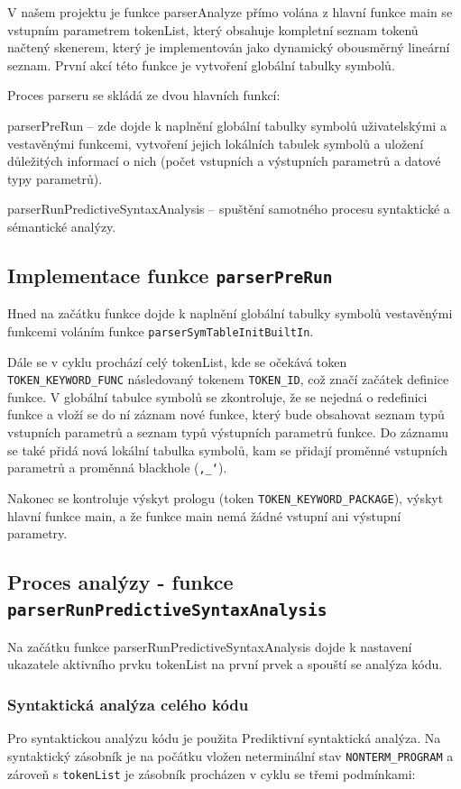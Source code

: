 \documentclass[a4paper, 12pt]{article}
\begin{document}
V našem projektu je funkce parserAnalyze přímo volána z hlavní funkce main se vstupním parametrem tokenList, který obsahuje kompletní seznam tokenů načtený skenerem, který je implementován jako dynamický obousměrný lineární seznam. První akcí této funkce je vytvoření globální tabulky symbolů.

Proces parseru se skládá ze dvou hlavních funkcí:

parserPreRun – zde dojde k naplnění globální tabulky symbolů uživatelskými a vestavěnými funkcemi, vytvoření jejich lokálních tabulek symbolů a uložení důležitých informací o nich (počet vstupních a výstupních parametrů a datové typy parametrů).

parserRunPredictiveSyntaxAnalysis – spuštění samotného procesu syntaktické a sémantické analýzy.

\subsection{Implementace funkce \protect\Verb|parserPreRun|}
Hned na začátku funkce dojde k naplnění globální tabulky symbolů vestavěnými funkcemi voláním funkce \verb|parserSymTableInitBuiltIn|.

Dále se v cyklu prochází celý tokenList, kde se očekává token \verb|TOKEN_KEYWORD_FUNC| následovaný tokenem \verb|TOKEN_ID|, což značí začátek definice funkce. V globální tabulce symbolů se zkontroluje, že se nejedná o redefinici funkce a vloží se do ní záznam nové funkce, který bude obsahovat seznam typů vstupních parametrů a seznam typů výstupních parametrů funkce. Do záznamu se také přidá nová lokální tabulka symbolů, kam se přidají proměnné vstupních parametrů a proměnná blackhole (\verb|‚_‘|).

Nakonec se kontroluje výskyt prologu (token \verb|TOKEN_KEYWORD_PACKAGE|), výskyt hlavní funkce main, a že funkce main nemá žádné vstupní ani výstupní parametry.

\subsection{Proces analýzy - funkce \protect\Verb|parserRunPredictiveSyntaxAnalysis|}
Na začátku funkce parserRunPredictiveSyntaxAnalysis dojde k nastavení ukazatele aktivního prvku tokenList na první prvek a spouští se analýza kódu.

\subsubsection{Syntaktická analýza celého kódu}
Pro syntaktickou analýzu kódu je použita Prediktivní syntaktická analýza. Na syntaktický zásobník je na počátku vložen neterminální stav \verb|NONTERM_PROGRAM| a zároveň s \verb|tokenList| je zásobník procházen v cyklu se třemi podmínkami:
\end{document}
